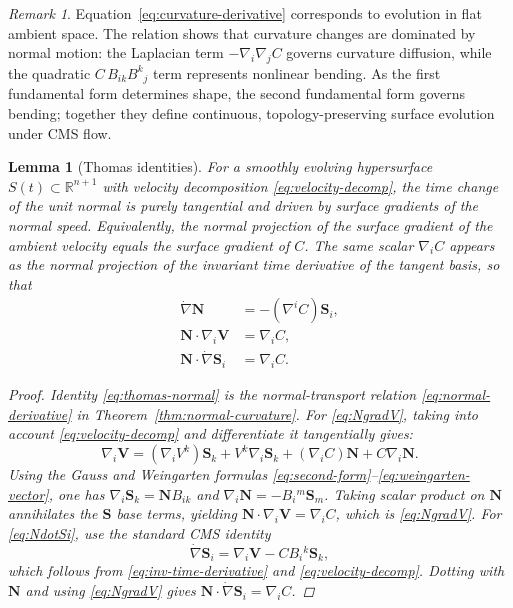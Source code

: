 \documentclass[11pt]{article}
\theoremstyle{definition}
\theoremstyle{plain}
\newtheorem{lemma}[definition]{Lemma}
\theoremstyle{remark}
\newtheorem{remark}[definition]{Remark}
\begin{document}
\begin{remark}
Equation~\eqref{eq:curvature-derivative} corresponds to evolution in flat ambient space.    
The relation shows that curvature changes are dominated by normal motion: the Laplacian term $-\nabla_i\nabla_jC$ governs curvature diffusion, while the quadratic $C\,B_{ik}B^{k}{}_{j}$ term represents nonlinear bending.  
As the first fundamental form determines shape, the second fundamental form governs bending; together they define continuous, topology-preserving surface evolution under CMS flow.
\end{remark}



\begin{lemma}[Thomas identities]\label{lem:thomas}
For a smoothly evolving hypersurface $S(t)\subset\mathbb{R}^{n+1}$ with velocity decomposition \eqref{eq:velocity-decomp}, the time change of the unit normal is purely tangential and driven by surface gradients of the normal speed. Equivalently, the normal projection of the surface gradient of the ambient velocity equals the surface gradient of $C$. The same scalar $\nabla_i C$ appears as the normal projection of the invariant time derivative of the tangent basis, so that
\begin{align}
\dot{\nabla}\mathbf{N} &= -(\nabla^{i}C) \mathbf{S}_i, \label{eq:thomas-normal}\\
\mathbf{N}\cdot\nabla_i \mathbf{V} &= \nabla_i C, \label{eq:NgradV}\\
\mathbf{N}\cdot\dot{\nabla}\mathbf{S}_i &= \nabla_i C. \label{eq:NdotSi}
\end{align}

\begin{proof}
Identity \eqref{eq:thomas-normal} is the normal-transport relation \eqref{eq:normal-derivative} in Theorem~\ref{thm:normal-curvature}. For \eqref{eq:NgradV}, taking into account \eqref{eq:velocity-decomp} and differentiate it tangentially gives:
\[
\nabla_i\mathbf{V}=(\nabla_i V^k)\mathbf{S}_k+V^k\nabla_i\mathbf{S}_k+(\nabla_i C)\mathbf{N}+C\nabla_i\mathbf{N}.
\]
Using the Gauss and Weingarten formulas \eqref{eq:second-form}--\eqref{eq:weingarten-vector}, one has $\nabla_i\mathbf{S}_k=\mathbf{N} B_{ik}$ and $\nabla_i\mathbf{N}=-B_i{}^{m}\mathbf{S}_m$. Taking scalar product on $\mathbf{N}$ annihilates the $\mathbf{S}$ base terms, yielding $\mathbf{N}\cdot\nabla_i\mathbf{V}=\nabla_i C$, which is \eqref{eq:NgradV}. For \eqref{eq:NdotSi}, use the standard CMS identity
\[
\dot{\nabla}\mathbf{S}_i=\nabla_i\mathbf{V}-C B_i{}^{k}\mathbf{S}_k,
\]
which follows from \eqref{eq:inv-time-derivative} and \eqref{eq:velocity-decomp}. Dotting with $\mathbf{N}$ and using \eqref{eq:NgradV} gives $\mathbf{N}\cdot\dot{\nabla}\mathbf{S}_i=\nabla_i C$.
\end{proof}
\end{lemma}
\end{document}
